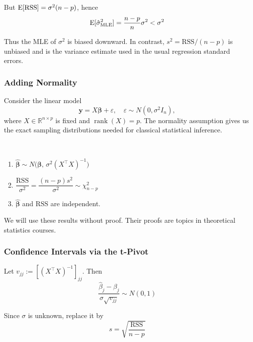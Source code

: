 But $\operatorname{E}[\text{RSS}]=\sigma^2(n-p)$, hence
\begin{equation*}
    \operatorname{E}[\hat\sigma^2_{\text{MLE}}] = \frac{n-p}{n}\sigma^2 < \sigma^2
\end{equation*}

Thus the MLE of $\sigma^2$ is biased downward. In contrast, $s^2 = \text{RSS}/(n-p)$ is unbiased and is the variance estimate used in the usual regression standard errors.

\subsubsection{Adding Normality}
Consider the linear model
\begin{equation*}
    \mathbf{y} = X\bm\beta + \varepsilon, \quad \varepsilon \sim N(0,\sigma^2 I_n),
\end{equation*}
where $X \in \mathbb{R}^{n \times p}$ is fixed and $\operatorname{rank}(X)=p$. The normality assumption gives us the exact sampling distributions needed for classical statistical inference.

\begin{result} \leavevmode\\
    \begin{enumerate}
        \item $\hat{\bm\beta} \sim N\big(\bm\beta,\, \sigma^2(X^\top X)^{-1}\big)$
        \item $\dfrac{\text{RSS}}{\sigma^2} = \dfrac{(n-p)s^2}{\sigma^2} \sim \chi^2_{n-p}$
        \item $\hat{\bm\beta}$ and $\text{RSS}$ are independent.
    \end{enumerate}
    We will use these results without proof. Their proofs are topics in theoretical statistics courses.
\end{result}

\subsubsection{Confidence Intervals via the t-Pivot}
Let $v_{jj} := [(X^\top X)^{-1}]_{jj}$. Then
\begin{equation*}
    \frac{\hat\beta_j - \beta_j}{\sigma\sqrt{v_{jj}}} \sim N(0,1)
\end{equation*}

Since $\sigma$ is unknown, replace it by
\begin{equation*}
    s = \sqrt{\frac{\text{RSS}}{n-p}}
\end{equation*}

